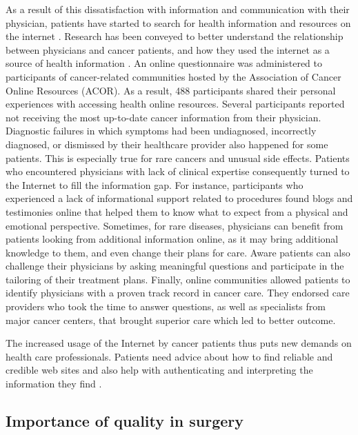 As a result of this dissatisfaction with information and communication with their physician, patients have started to search for health information and resources on the internet \cite{chen_impact_2001,pereira_internet_2000,ziebland_how_2004,dolce_internet_2011}. Research has been conveyed to better understand the relationship between physicians and cancer patients, and how they used the internet as a source of health information \cite{dolce_internet_2011}. An online questionnaire was administered to participants of cancer-related communities hosted by the Association of Cancer Online Resources (ACOR). As a result, 488 participants shared their personal experiences with accessing health online resources. Several participants reported not receiving the most up-to-date cancer information from their physician. Diagnostic failures in which symptoms had been undiagnosed, incorrectly diagnosed, or dismissed by their healthcare provider also happened for some patients. This is especially true for rare cancers and unusual side effects. Patients who encountered physicians with lack of clinical expertise consequently turned to the Internet to fill the information gap. For instance, participants who experienced a lack of informational support related to procedures found blogs and testimonies online that helped them to know what to expect from a physical and emotional perspective. Sometimes, for rare diseases, physicians can benefit from patients looking from additional information online, as it may bring additional knowledge to them, and even change their plans for care. Aware patients can also challenge their physicians by asking meaningful questions and participate in the tailoring of their treatment plans. Finally, online communities allowed patients to identify physicians with a proven track record in cancer care. They endorsed care providers who took the time to answer questions, as well as specialists from major cancer centers, that brought superior care which led to better outcome.

The increased usage of the Internet by cancer patients thus puts new demands on health care professionals. Patients need advice about how to find reliable and credible web sites and also help with authenticating and interpreting the information they find \cite{carlsson_cancer_2009}.

\subsection{Importance of quality in surgery}


